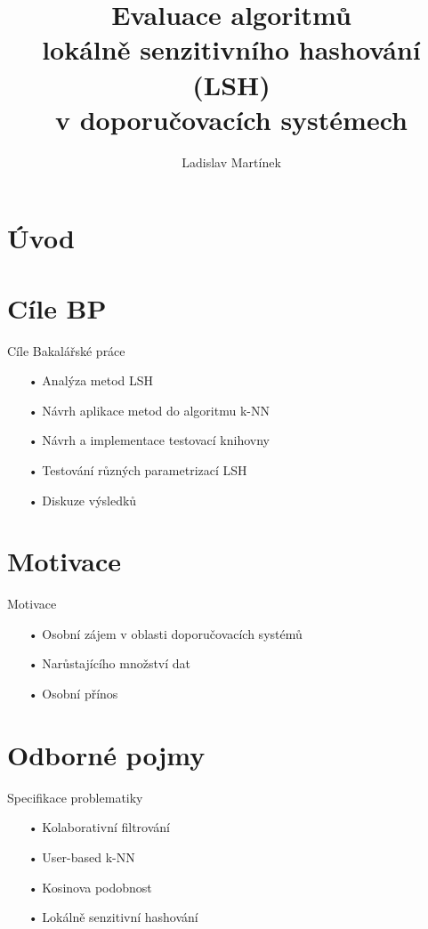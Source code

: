 \documentclass[aspectratio=169,28pt]{beamer}
\title{Evaluace algoritmů\\ lokálně senzitivního hashování (LSH)\\ v doporučovacích systémech}
\author{Ladislav Martínek}
\begin{document}
\section{Úvod}
\begin{frame}
\titlepage
\end{frame}

\section{Cíle BP}
\begin{frame}{Cíle Bakalářské práce}
       \begin{itemize}
		\item[•] Analýza metod LSH 
		\item[•] Návrh aplikace metod do algoritmu k-NN 
		\item[•] Návrh a implementace testovací knihovny
		\item[•] Testování různých parametrizací LSH
		\item[•] Diskuze výsledků
		\end{itemize}
\end{frame}

\section{Motivace}
\begin{frame}{Motivace}
		\begin{itemize}
		\item[•] Osobní zájem v oblasti doporučovacích systémů
		\item[•] Narůstajícího množství dat
		\item[•] Osobní přínos
		\end{itemize}
\end{frame}

\section{Odborné pojmy}
\begin{frame}{Specifikace problematiky}
		\begin{itemize}
		\item[•] Kolaborativní filtrování
		\item[•] User-based k-NN
		\item[•] Kosinova podobnost
		\item[•] Lokálně senzitivní hashování
		\end{itemize}
\end{frame}
\end{document}
